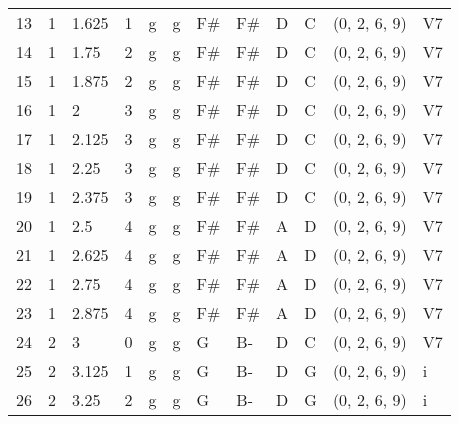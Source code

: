 \begin{tabular}{llllllllllll}
13  & 1       & 1.625  & 1               & g          & g              & F#     & F#      & D      & C         & (0, 2, 6, 9)     & V7             \\
14  & 1       & 1.75   & 2               & g          & g              & F#     & F#      & D      & C         & (0, 2, 6, 9)     & V7             \\
15  & 1       & 1.875  & 2               & g          & g              & F#     & F#      & D      & C         & (0, 2, 6, 9)     & V7             \\
16  & 1       & 2      & 3               & g          & g              & F#     & F#      & D      & C         & (0, 2, 6, 9)     & V7             \\
17  & 1       & 2.125  & 3               & g          & g              & F#     & F#      & D      & C         & (0, 2, 6, 9)     & V7             \\
18  & 1       & 2.25   & 3               & g          & g              & F#     & F#      & D      & C         & (0, 2, 6, 9)     & V7             \\
19  & 1       & 2.375  & 3               & g          & g              & F#     & F#      & D      & C         & (0, 2, 6, 9)     & V7             \\
20  & 1       & 2.5    & 4               & g          & g              & F#     & F#      & A      & D         & (0, 2, 6, 9)     & V7             \\
21  & 1       & 2.625  & 4               & g          & g              & F#     & F#      & A      & D         & (0, 2, 6, 9)     & V7             \\
22  & 1       & 2.75   & 4               & g          & g              & F#     & F#      & A      & D         & (0, 2, 6, 9)     & V7             \\
23  & 1       & 2.875  & 4               & g          & g              & F#     & F#      & A      & D         & (0, 2, 6, 9)     & V7             \\
24  & 2       & 3      & 0               & g          & g              & G      & B-      & D      & C         & (0, 2, 6, 9)     & V7             \\
25  & 2       & 3.125  & 1               & g          & g              & G      & B-      & D      & G         & (0, 2, 6, 9)     & i              \\
26  & 2       & 3.25   & 2               & g          & g              & G      & B-      & D      & G         & (0, 2, 6, 9)     & i              \\

\end{tabular}
